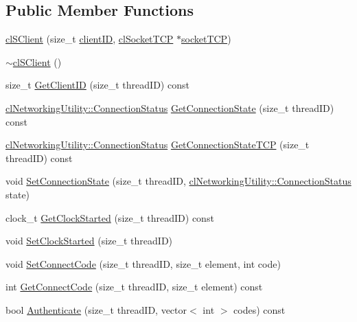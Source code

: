 \subsection*{Public Member Functions}
\begin{DoxyCompactItemize}
\item 
\hyperlink{classcl_s_client_a738a8350fb3fb861342d13b1b89fbccc}{clSClient} (size\_\-t \hyperlink{classcl_s_client_ac5af0964e2af13aab950694923308512}{clientID}, \hyperlink{classcl_socket_t_c_p}{clSocketTCP} $\ast$\hyperlink{classcl_s_client_a7cc5ca2a86b8b3a96884ed174dffb0f3}{socketTCP})
\item 
\hyperlink{classcl_s_client_a9af97875b5c08340d81678e9a821bddc}{$\sim$clSClient} ()
\item 
size\_\-t \hyperlink{classcl_s_client_ad20ec8875bb3fb9fb3536d05ffc1f397}{GetClientID} (size\_\-t threadID) const 
\item 
\hyperlink{classcl_networking_utility_a15dd34683154e07d5843f8f5432fec6d}{clNetworkingUtility::ConnectionStatus} \hyperlink{classcl_s_client_aa720bde21885b93a7428a10156aaebd4}{GetConnectionState} (size\_\-t threadID) const 
\item 
\hyperlink{classcl_networking_utility_a15dd34683154e07d5843f8f5432fec6d}{clNetworkingUtility::ConnectionStatus} \hyperlink{classcl_s_client_aa63c3f33269e76af35326ace504cc759}{GetConnectionStateTCP} (size\_\-t threadID) const 
\item 
void \hyperlink{classcl_s_client_aaead23b701d0c8c75346e7cdd26fd8bc}{SetConnectionState} (size\_\-t threadID, \hyperlink{classcl_networking_utility_a15dd34683154e07d5843f8f5432fec6d}{clNetworkingUtility::ConnectionStatus} state)
\item 
clock\_\-t \hyperlink{classcl_s_client_af044934846909919990d3cc1e0cb9307}{GetClockStarted} (size\_\-t threadID) const 
\item 
void \hyperlink{classcl_s_client_a29a4d9e44330e35810c6cf27ee78f6dc}{SetClockStarted} (size\_\-t threadID)
\item 
void \hyperlink{classcl_s_client_a1717c472aa382b90260e10fe569f4663}{SetConnectCode} (size\_\-t threadID, size\_\-t element, int code)
\item 
int \hyperlink{classcl_s_client_ac88dd15044e25a0a27c8c05671070c2f}{GetConnectCode} (size\_\-t threadID, size\_\-t element) const 
\item 
bool \hyperlink{classcl_s_client_a1ab3b96d9b2ec36ae14dd294c374b455}{Authenticate} (size\_\-t threadID, vector$<$ int $>$ codes) const 
\item 

\end{DoxyCompactItemize}
